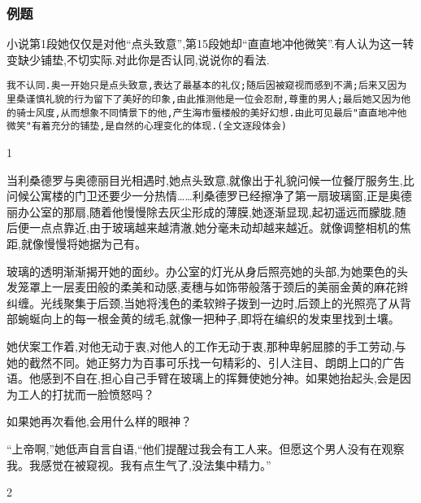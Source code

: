 \documentclass{ctexart}
\newcommand{\nm}{\normalsize}
\renewcommand{\\}{\par}
\begin{document}
\subsubsection{例题}
\\小说第1段她仅仅是对他``点头致意'',第15段她却``直直地冲他微笑''.有人认为这一转变缺少铺垫,不切实际.对此你是否认同,说说你的看法. 
\\ \texttt{我不认同.奥一开始只是点头致意,表达了最基本的礼仪;随后因被窥视而感到不满;后来又因为里桑谨慎礼貌的行为留下了美好的印象,由此推测他是一位会忍耐,尊重的男人;最后她又因为他的骑士风度,从而想象不同情景下的他,产生海市蜃楼般的美好幻想.由此可见最后"直直地冲他微笑"有着充分的铺垫,是自然的心理变化的体现.(全文逐段体会)}
\nm \fangsong \\ \begin{center} 1 \end{center} \\当利桑德罗与奥德丽目光相遇时,她点头致意,就像出于礼貌问候一位餐厅服务生,比问候公寓楼的门卫还要少一分热情……利桑德罗已经擦净了第一扇玻璃窗,正是奥德丽办公室的那扇,随着他慢慢除去灰尘形成的薄膜,她逐渐显现,起初遥远而朦胧,随后便一点点靠近,由于玻璃越来越清澈,她分毫未动却越来越近。就像调整相机的焦距,就像慢慢将她据为己有。\\玻璃的透明渐渐揭开她的面纱。办公室的灯光从身后照亮她的头部,为她栗色的头发笼罩上一层麦田般的柔美和动感,麦穗与如饰带般落于颈后的美丽金黄的麻花辫纠缠。光线聚集于后颈,当她将浅色的柔软辫子拨到一边时,后颈上的光照亮了从背部蜿蜒向上的每一根金黄的绒毛,就像一把种子,即将在编织的发束里找到土壤。 \\她伏案工作着,对他无动于衷,对他人的工作无动于衷,那种卑躬屈膝的手工劳动,与她的截然不同。她正努力为百事可乐找一句精彩的、引人注目、朗朗上口的广告语。他感到不自在,担心自己手臂在玻璃上的挥舞使她分神。如果她抬起头,会是因为工人的打扰而一脸愤怒吗？ \\如果她再次看他,会用什么样的眼神？ \\``上帝啊,''她低声自言自语,``他们提醒过我会有工人来。但愿这个男人没有在观察我。我感觉在被窥视。我有点生气了,没法集中精力。'' \\ \begin{center} 2 \end{center} 
\end{document}
